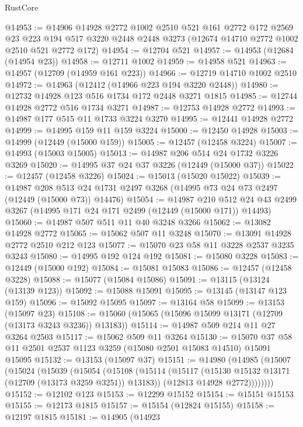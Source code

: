 \begin{lexlean}{RustCore}
\begin{coremodule}
@14953 := @14906
    @14928
    @2772
    @1002
    @2510
    @521
    @161
    @2772
    @172
    @2569
    @23
    @223
    @194
    @517
    @3220
    @2448
    @2448
    @3273
    (@12674 @14710 @2772 @1002 @2510 @521 @2772 @172)
@14954 := @12704 @521
@14957 := @14953 (@12684 (@14954 @23))
@14958 := @12711 @1002
@14959 := @14958 @521
@14963 := @14957 (@12709 (@14959 @161 @223))
@14966 := @12719 @14710 @1002 @2510
@14972 := @14963 (@12412 (@14966 @223 @194 @3220 @2448))
@14980 := @12732 @14928 @123 @516 @1734 @172 @2448 @3271 @1815
@14985 := @12744 @14928 @2772 @516 @1734 @3271
@14987 := @12753 @14928 @2772
@14993 := @14987 @177 @515 @11 @1733 @3224 @3270
@14995 := @12441 @14928 @2772
@14999 := @14995 @159 @11 @159 @3224
@15000 := @12450 @14928
@15003 := @14999 (@12449 (@15000 @159))
@15005 := @12457 (@12458 @3224)
@15007 := @14993 (@15003 @15005)
@15013 := @14987 @206 @514 @24 @1732 @3226 @3269
@15020 := @14995 @37 @24 @37 @3226 (@12449 (@15000 @37))
@15022 := @12457 (@12458 @3226)
@15024 := @15013 (@15020 @15022)
@15039 := @14987
    @208
    @513
    @24
    @1731
    @2497
    @3268
    (@14995 @73 @24 @73 @2497 (@12449 (@15000 @73)) @14476)
@15054 := @14987
    @210
    @512
    @24
    @43
    @2499
    @3267
    (@14995 @171 @24 @171 @2499 (@12449 (@15000 @171)) @14493)
@15060 := @14987 @507 @511 @11 @40 @3248 @3266
@15062 := @13082 @14928 @2772
@15065 := @15062 @507 @11 @3248
@15070 := @13091 @14928 @2772 @2510 @212 @123
@15077 := @15070 @23 @58 @11 @3228 @2537 @3235 @3243
@15080 := @14995 @192 @124 @192
@15081 := @15080 @3228
@15083 := @12449 (@15000 @192)
@15084 := @15081 @15083
@15086 := @12457 (@12458 @3228)
@15088 := @15077 (@15084 @15086)
@15091 := @13115 (@13124 (@13139 @123))
@15092 := @15088 @15091
@15095 := @13145 (@13147 @123 @159)
@15096 := @15092 @15095
@15097 := @13164 @58
@15099 := @13153 (@15097 @23)
@15108 := @15060 (@15065 (@15096 @15099 @13171 (@12709 (@13173 @3243 @3236)) @13183))
@15114 := @14987 @509 @214 @11 @27 @3264 @2503
@15117 := @15062 @509 @11 @3264
@15130 := @15070 @37 @58 @11 @2501 @2537 @1123 @3259 (@15080 @2501 @15083 @14510) @15091 @15095
@15132 := @13153 (@15097 @37)
@15151 := @14980
    (@14985
      (@15007
        (@15024
          (@15039
            (@15054
              (@15108
                (@15114
                  (@15117 (@15130 @15132 @13171 (@12709 (@13173 @3259 @3251)) @13183))
                  (@12813 @14928 @2772))))))))
@15152 := @12102 @123
@15153 := @12299 @15152
@15154 := @15151 @15153
@15155 := @12173 @1815
@15157 := @15154 (@12824 @15155)
@15158 := @12197 @1815
@15181 := @14905
    (@14923

\end{coremodule}
\end{lexlean}
